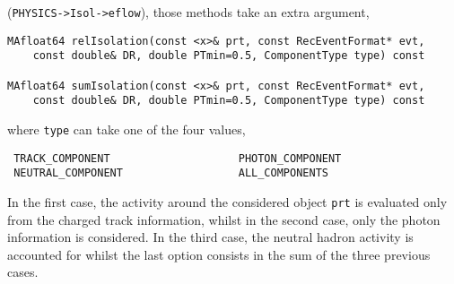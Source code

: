 \documentclass[a4paper]{article}
\begin{document}
(\verb?PHYSICS->Isol->eflow?), those methods take an extra argument,
{\color{ao}
\begin{verbatim}
MAfloat64 relIsolation(const <x>& prt, const RecEventFormat* evt,
    const double& DR, double PTmin=0.5, ComponentType type) const

MAfloat64 sumIsolation(const <x>& prt, const RecEventFormat* evt,
    const double& DR, double PTmin=0.5, ComponentType type) const
\end{verbatim}
}
where {\color{ao}\verb+type+} can take one of the four values,
{\color{ao}\begin{verbatim}
 TRACK_COMPONENT                    PHOTON_COMPONENT
 NEUTRAL_COMPONENT                  ALL_COMPONENTS
\end{verbatim}}
In the first case, the activity around the considered object {\color{ao}\verb+prt+} is
evaluated only from the charged track information, whilst in the
second case, only the photon information is considered. In the
third case, the neutral hadron activity is accounted for whilst the last option
consists in the sum of the three previous cases.
\end{document}
